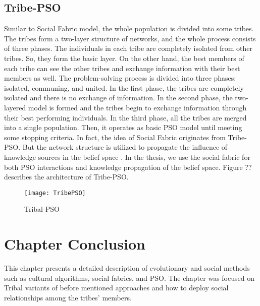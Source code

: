 \subsection{Tribe-PSO}
Similar to Social Fabric model, the whole population is divided into some tribes.  The tribes form a two-layer structure of networks, and the whole process consists of three phases. The individuals in each tribe are completely isolated from other tribes. So, they form the basic layer. On the other hand, the best members of each tribe can see the other tribes and exchange information with their best members as well. The problem-solving process is divided into three phases: isolated, communing, and united. In the first phase, the tribes are completely isolated and there is no exchange of information. In the second phase, the two-layered model is formed and the tribes begin to exchange information through their best performing individuals. In the third phase, all the tribes are merged into a single population. Then, it operates as basic PSO model until meeting some stopping criteria. In fact, the idea of Social Fabric originates from Tribe-PSO. But the network structure is utilized to propagate the influence of knowledge sources in the belief space \cite{chen2006tribe}. In the thesis, we use the social fabric for both PSO interactions and knowledge propagation of the belief space. Figure ?? describes the architecture of Tribe-PSO.
\begin{figure}[h]
	\texttt{[image: TribePSO]}
	\centering
	\caption{Tribal-PSO}
	\label{fig:TribePSO}
\end{figure}

\section{Chapter Conclusion}
This chapter presents a detailed description of evolutionary and social methods such as cultural algorithms, social fabrics, and PSO. The chapter was focused on Tribal variants of before mentioned approaches and how to deploy social relationships among the tribes' members. 







